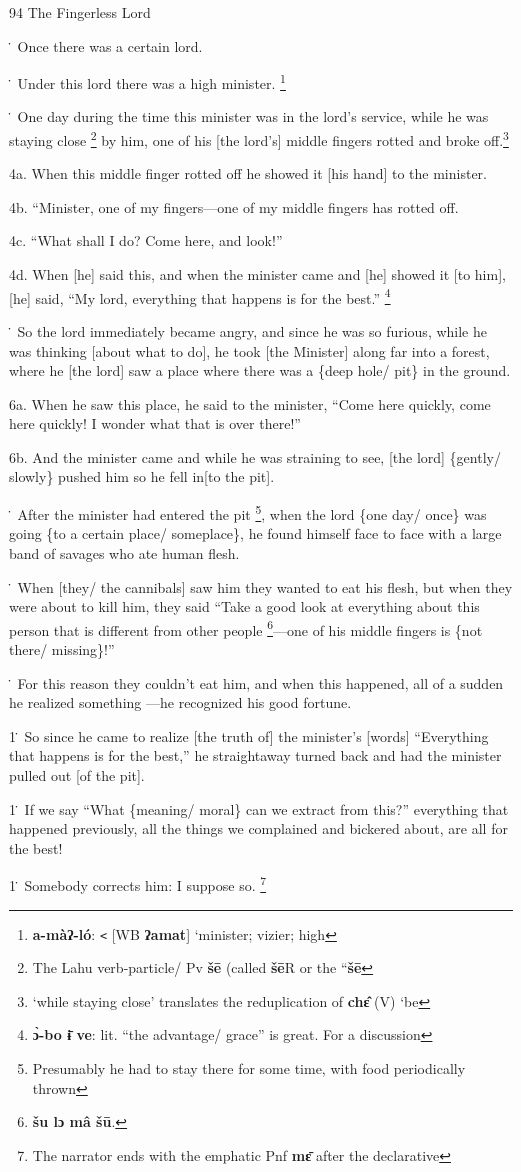 
94 The Fingerless Lord

\. Once there was a certain lord.

\. Under this lord there was a high minister. \footnote{\textbf{a-màʔ-ló}: \texttt{<} [WB \textbf{ʔamat}] `minister; vizier; high}

\. One day during the time this minister was in the lord's service, while he was
staying close \footnote{The Lahu verb-particle/ Pv \textbf{šē} (called \textbf{šē}R or the ``\textbf{šē}} by him, one of his [the lord's] middle fingers rotted and broke
off.\footnote{`while staying close' translates the reduplication of \textbf{chɛ̂} (V) `be}

4a. When this middle finger rotted off he showed it [his hand] to the minister.

4b. ``Minister, one of my fingers---one of my middle fingers has rotted off.

4c. ``What shall I do? Come here, and look!''

4d. When [he] said this, and when the minister came and [he] showed it [to him],
[he] said, ``My lord, everything that happens is for the best.'' \footnote{\textbf{ɔ̀-bo ɨ̄ ve}: lit. ``the advantage/ grace'' is great. For a discussion}

\. So the lord immediately became angry, and since he was so furious, while he
was thinking [about what to do], he took [the Minister] along far into a forest,
where he [the lord] saw a place where there was a \{deep hole/ pit\} in the ground.

6a. When he saw this place, he said to the minister, ``Come here quickly, come
here quickly!  I wonder what that is over there!''

6b. And the minister came and while he was straining to see, [the lord] \{gently/
slowly\} pushed him so he fell in[to the pit].

\. After the minister had entered the pit \footnote{Presumably he had to stay there for some time, with food periodically thrown}, when the lord \{one day/ once\}
was going \{to a certain place/ someplace\}, he found himself face to face with
a large band of savages who ate human flesh.

\. When [they/ the cannibals] saw him they wanted to eat his flesh, but when they
were about to kill him, they said ``Take a good look at everything about this person
that is different from other people \footnote{\textbf{šu lɔ  mâ  šū}.}---one of his middle fingers is \{not there/
missing\}!''

\. For this reason they couldn't eat him, and when this happened, all of a sudden
he realized something ---he recognized his good fortune.

1\. So since he came to realize [the truth of] the minister's [words] ``Everything
that happens is for the best,'' he straightaway turned back and had the minister
pulled out [of the pit].

1\. If we say ``What \{meaning/ moral\} can we extract from this?'' everything
that happened previously, all the things we complained and bickered about, are
all for the best!

1\. Somebody corrects him: I suppose so. \footnote{The narrator ends with the emphatic Pnf \textbf{mɛ̄} after the declarative}

